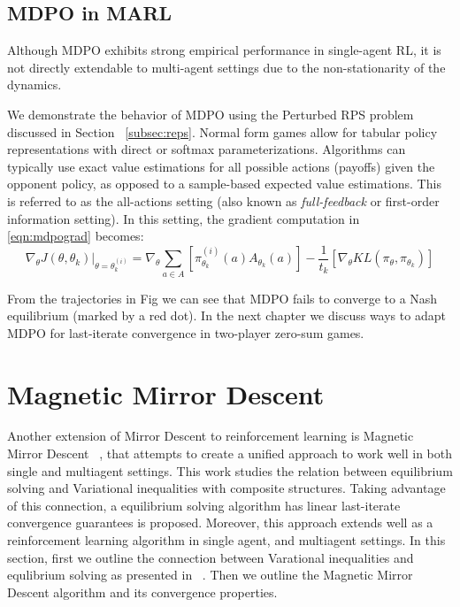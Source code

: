\subsection{MDPO in MARL}
Although MDPO exhibits strong empirical performance in single-agent RL, it is not directly
extendable to multi-agent settings due to the non-stationarity of the dynamics.

We demonstrate the behavior of MDPO using the Perturbed RPS problem discussed in Section~
\ref{subsec:reps}.
Normal form games allow for tabular policy representations with direct or softmax
parameterizations.
Algorithms can typically use exact value estimations for all possible actions (payoffs) given the
opponent policy, as opposed to a sample-based expected value estimations.
This is referred to as the all-actions setting (also known as \textit{full-feedback} or first-order
information setting).
In this setting, the gradient computation in~ \ref{eqn:mdpograd} becomes: \[ \nabla_{\theta}
	J(\theta, \theta_k)|_{\theta = \theta_k^{(i)}} = \nabla_{\theta} \sum_{a \in A} [
		\pi_{\theta_k}^{(i)} (a) A_{\theta_k}(a)] - \frac{1}{t_k} [\nabla_\theta KL(\pi_\theta,
		\pi_{\theta_k})] \]

From the trajectories in Fig  we
can see that MDPO fails to converge to a Nash equilibrium (marked by a red dot).
In the next chapter we discuss ways to adapt MDPO for last-iterate convergence in two-player
zero-sum games.

\section[MMD]{Magnetic Mirror Descent}

Another extension of Mirror Descent to reinforcement learning is Magnetic Mirror Descent~
\cite{sokotaUnified2023}, that attempts to create a unified approach to work well in both single
and multiagent settings.
This work studies the relation between equilibrium solving and Variational inequalities with
composite structures.
Taking advantage of this connection, a equilibrium solving algorithm has linear last-iterate
convergence guarantees is proposed.
Moreover, this approach extends well as a reinforcement learning algorithm in single agent, and
multiagent settings.
In this section, first we outline the connection between Varational inequalities and equlibrium
solving as presented in~ \cite{sokotaUnified2023}.
Then we outline the Magnetic Mirror Descent algorithm and its convergence properties.

